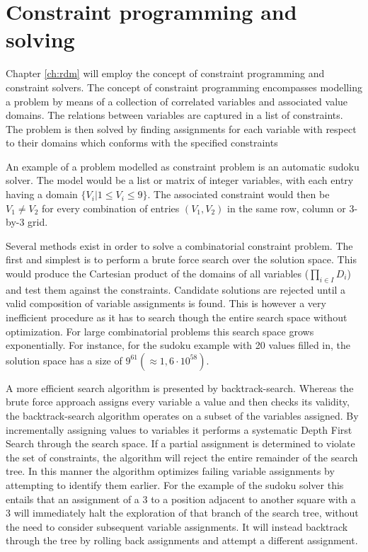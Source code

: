 \section{Constraint programming and solving}
\label{sec:back:constraint}
Chapter \ref{ch:rdm} will employ the concept of constraint programming and constraint solvers. The concept of constraint programming encompasses modelling a problem by means of a collection of correlated variables and associated value domains. The relations between variables are captured in a list of constraints. The problem is then solved by finding assignments for each variable with respect to their domains which conforms with the specified constraints

An example of a problem modelled as constraint problem is an automatic sudoku solver. The model would be a list or matrix of integer variables, with each entry having a domain $\{V_i|1\leq V_i\leq 9\}$. The associated constraint would then be $V_1 \neq V_2$ for every combination of entries $(V_1,V_2)$ in the same row, column or 3-by-3 grid.

Several methods exist in order to solve a combinatorial constraint problem. The first and simplest is to perform a brute force search over the solution space. This would produce the Cartesian product of the domains of all variables ($\prod_{i\in I} D_i$) and test them against the constraints. Candidate solutions are rejected until a valid composition of variable assignments is found. This is however a very inefficient procedure as it has to search though the entire search space without optimization. For large combinatorial problems this search space grows exponentially. For instance, for the sudoku example with 20 values filled in, the solution space has a size of $9^{61}(\approx 1,6\cdot 10^{58})$.

A more efficient search algorithm is presented by backtrack-search. Whereas the brute force approach assigns every variable a value and then checks its validity, the backtrack-search algorithm operates on a subset of the variables assigned. By incrementally assigning values to variables it performs a systematic Depth First Search through the search space. If a partial assignment is determined to violate the set of constraints, the algorithm will reject the entire remainder of the search tree. In this manner the algorithm optimizes failing variable assignments by attempting to identify them earlier. For the example of the sudoku solver this entails that an assignment of a 3 to a position adjacent to another square with a 3 will immediately halt the exploration of that branch of the search tree, without the need to consider subsequent variable assignments. It will instead backtrack through the tree by rolling back assignments and attempt a different assignment.

